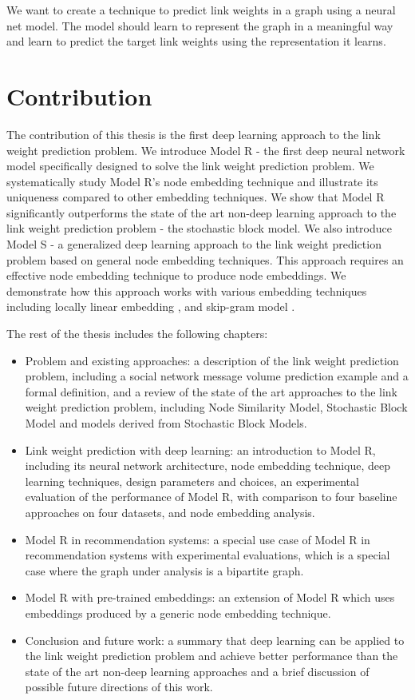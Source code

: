 \documentclass[12pt]{WSUThesis}
\theoremstyle{definition}
\begin{document}
We want to create a technique to predict link weights in a graph using a 
neural net model.
The model should learn to represent the graph in a meaningful way and learn to predict the target link weights using the representation it learns.

\section{Contribution}
The contribution of this thesis is
the first deep learning approach to the link weight prediction problem.
We introduce Model R - the first deep neural network model specifically designed to solve the link weight prediction problem.
We systematically study Model R's node embedding technique and illustrate its uniqueness compared to other embedding techniques.
We show that Model R significantly outperforms the state of the art non-deep learning approach to the link weight prediction problem - the stochastic block model.
We also introduce Model S - a generalized deep learning approach to the link weight prediction problem based on general node embedding techniques.
This approach requires an effective node embedding technique to produce node embeddings.
We demonstrate how this approach works with various embedding techniques including locally linear embedding \citep{roweis2000nonlinear}, and skip-gram model \citep{grover2016node2vec}.

The rest of the thesis includes the following chapters:
\begin{itemize}
	\item Problem and existing approaches: a description of the link weight prediction problem, including a social network message volume prediction example and a formal definition, and a review of the state of the art approaches to the link weight prediction problem, including Node Similarity Model, Stochastic Block Model and models derived from Stochastic Block Models.
	\item Link weight prediction with deep learning: an introduction to Model R, including its neural network architecture, node embedding technique, deep learning techniques, design parameters and choices, an experimental evaluation of the performance of Model R, with comparison to four baseline approaches on four datasets, and node embedding analysis.
	\item Model R in recommendation systems: a special use case of Model R in recommendation systems with experimental evaluations, which is a special case where the graph under analysis is a bipartite graph.
	\item Model R with pre-trained embeddings: an extension of Model R which uses embeddings produced by a generic node embedding technique.
	\item Conclusion and future work: a summary that deep learning can be applied to the link weight prediction problem and achieve better performance than the state of the art non-deep learning approaches and a brief discussion of possible future directions of this work.
\end{itemize}
\end{document}
